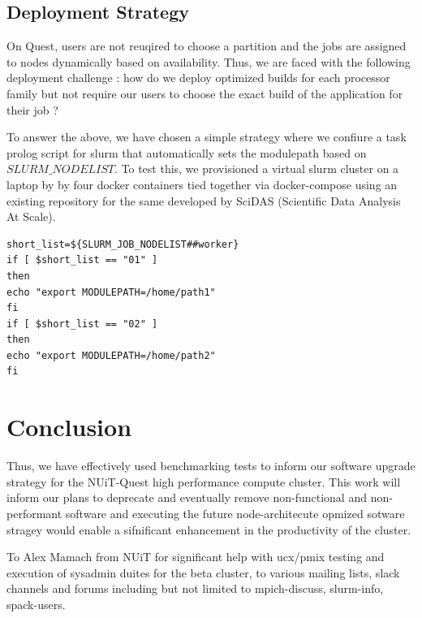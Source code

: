\documentclass[sigconf,authordraft]{acmart}
\begin{document}
\subsection{Deployment Strategy}
On Quest, users are not reuqired to choose a partition and the jobs are assigned to nodes dynamically based on availability. Thus, we are faced with the following deployment challenge : how do we deploy optimized builds for each processor family but not require our users to choose the exact build of the application for their job ?

To answer the above, we have chosen a simple strategy where we confiure a task prolog script for slurm that automatically sets the modulepath based on $SLURM\_NODELIST$. To test this, we provisioned a virtual slurm cluster on a laptop by by four docker containers tied together via docker-compose using an existing repository \cite{slurmdocker_repository} for the same developed by SciDAS (Scientific Data Analysis At Scale).

\begin{verbatim}
short_list=${SLURM_JOB_NODELIST##worker}
if [ $short_list == "01" ]
then
echo "export MODULEPATH=/home/path1"
fi
if [ $short_list == "02" ]
then
echo "export MODULEPATH=/home/path2"
fi
\end{verbatim}

\section{Conclusion}

Thus, we have effectively used benchmarking tests to inform our software upgrade strategy for the NUiT-Quest high performance compute cluster. This work will inform our plans to deprecate and eventually remove non-functional and non-performant software and executing the future node-architecute opmized sotware stragey would enable a  sifnificant enhancement in the productivity of the cluster.

\begin{acks}
To Alex Mamach from NUiT for significant help with ucx/pmix testing and execution of sysadmin duites for the beta cluster, to various mailing lists, slack channels and forums including but not limited to mpich-discuss, slurm-info, spack-users.
\end{acks}
\end{document}
